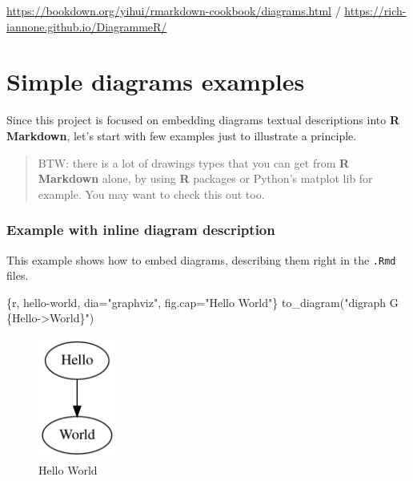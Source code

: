 \documentclass[
  12pt,
  a4paper,
  12pt,
  oneside,
  openany]{book}
\newenvironment{Shaded}{\begin{snugshade}}{\end{snugshade}}
\newcommand{\DataTypeTok}[1]{\textcolor[rgb]{0.27,0.27,0.27}{#1}}
\newcommand{\StringTok}[1]{\textcolor[rgb]{0.5,0.5,0.5}{#1}}
\begin{document}
\url{https://bookdown.org/yihui/rmarkdown-cookbook/diagrams.html} / \url{https://rich-iannone.github.io/DiagrammeR/}

\hypertarget{examples}{%
\chapter{Simple diagrams examples}\label{examples}}

Since this project is focused on embedding diagrams textual descriptions into \textbf{R Markdown}, let's start with few examples just to illustrate a principle.

\begin{quote}
BTW: there is a lot of drawings types that you can get from \textbf{R Markdown} alone, by using \textbf{R} packages or Python's matplot lib for example. You may want to check this out too.
\end{quote}

\hypertarget{examples-inline}{%
\subsection*{Example with inline diagram description}\label{examples-inline}}


This example shows how to embed diagrams, describing them right in the \texttt{.Rmd} files.

\begin{Shaded}
\begin{Highlighting}[]
\StringTok{\textasciigrave{}\textasciigrave{}\textasciigrave{}}\DataTypeTok{\{r, hello{-}world, dia="graphviz", fig.cap="Hello World"\}}
\DataTypeTok{  to\_diagram("digraph G \{Hello{-}\textgreater{}World\}")}
\StringTok{\textasciigrave{}\textasciigrave{}\textasciigrave{}}
\end{Highlighting}
\end{Shaded}

\begin{figure}

{\centering \includegraphics[height=4cm]{generated/hello-world} 

}

\caption{Hello World}\label{fig:hello-world}
\end{figure}
\end{document}
